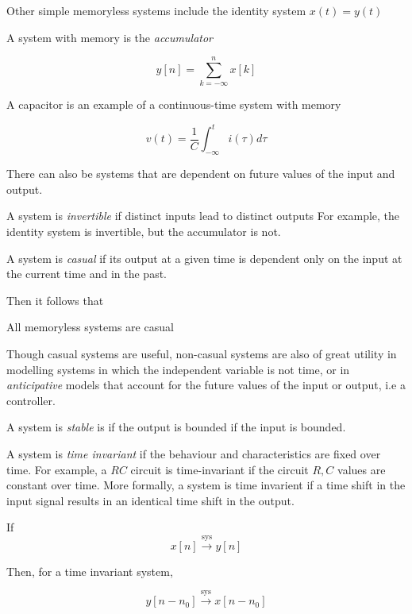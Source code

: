 \documentclass[../notes.tex]{subfiles}
\begin{document}
Other simple memoryless systems include the identity system $ x(t) = y(t) $



A system with memory is the \textit{accumulator}  

\begin{equation}
	y[n] = \sum^n_{k=-\infty} x[k]
\end{equation}


A capacitor is an example of a continuous-time system with memory

\begin{equation}
	v(t) = \frac{1}{C} \int^{t}_{-\infty} i(\tau) d\tau
\end{equation}

There can also be systems that are dependent on future values of the input and output.



\begin{definition}
	A system is \textit{invertible} if distinct inputs lead to distinct outputs
	For example, the identity system is invertible, but the accumulator is not.
\end{definition}

\begin{definition}
	A system is \textit{casual} if its output at a given time is dependent only on the input at the current time and in the past.
\end{definition}

Then it follows that
\begin{lemma}
	All memoryless systems are casual
\end{lemma}

Though casual systems are useful, non-casual systems are also of great utility in modelling systems in which the independent variable is not time, or in \textit{anticipative} models that account for the future values of the input or output, i.e a controller.


\begin{definition}
	A system is \textit{stable} is if the output is bounded if the input is bounded.
\end{definition}


\begin{definition}
	A system is \textit{time invariant}  if the behaviour and characteristics are fixed over time.
	For example, a $ RC $ circuit is time-invariant if the circuit $ R, C $ values are constant over time. More formally, a system is time invarient if a time shift in the input signal results in an identical time shift in the output.

	If	
	\begin{equation}
		x[n] \xrightarrow{\text{sys}} y[n]
	\end{equation}

	Then, for a time invariant system,

	\begin{equation}
		y[n-n_0] \xrightarrow{\text{sys}} x[n-n_0]
	\end{equation}

\end{definition}
\end{document}
